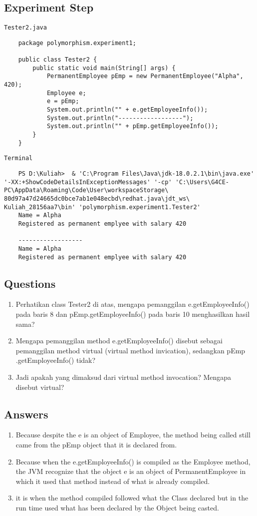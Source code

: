 \documentclass[12pt,titlepage]{article}
\begin{document}
\subsection{Experiment Step}
\texttt{Tester2.java}
\begin{verbatim}
    package polymorphism.experiment1;

    public class Tester2 {
        public static void main(String[] args) {
            PermanentEmployee pEmp = new PermanentEmployee("Alpha", 420);
            Employee e;
            e = pEmp;
            System.out.println("" + e.getEmployeeInfo());
            System.out.println("------------------");
            System.out.println("" + pEmp.getEmployeeInfo());
        }
    }
\end{verbatim}

\texttt{Terminal}
\begin{verbatim}
    PS D:\Kuliah>  & 'C:\Program Files\Java\jdk-18.0.2.1\bin\java.exe' '-XX:+ShowCodeDetailsInExceptionMessages' '-cp' 'C:\Users\G4CE-PC\AppData\Roaming\Code\User\workspaceStorage\ 80d97a47d24665dc0bce7ab1e048ecbd\redhat.java\jdt_ws\ Kuliah_28156aa7\bin' 'polymorphism.experiment1.Tester2'     
    Name = Alpha
    Registered as permanent emplyee with salary 420

    ------------------
    Name = Alpha
    Registered as permanent emplyee with salary 420
\end{verbatim}
\subsection{Questions}
\begin{enumerate}
    \item Perhatikan class Tester2 di atas, mengapa pemanggilan e.getEmployeeInfo() pada baris 8 dan pEmp.getEmployeeInfo() pada baris 10 menghasilkan hasil sama? 
    \item Mengapa pemanggilan method e.getEmployeeInfo() disebut sebagai pemanggilan method virtual (virtual method invication), sedangkan pEmp .getEmployeeInfo() tidak?
    \item Jadi apakah yang dimaksud dari virtual method invocation? Mengapa disebut virtual?
\end{enumerate}
\subsection{Answers}
\begin{enumerate}
    \item Because despite the e is an object of Employee, the method being called still came from the pEmp object that it is declared from.
    \item Because when the e.getEmployeeInfo() is compiled as the Employee method, the JVM recognize that the object e is an object of PermanentEmployee in which it used that method instead of what is already compiled.
    \item it is when the method compiled followed what the Class declared but in the run time used what has been declared by the Object being casted.
\end{enumerate}
\end{document}
